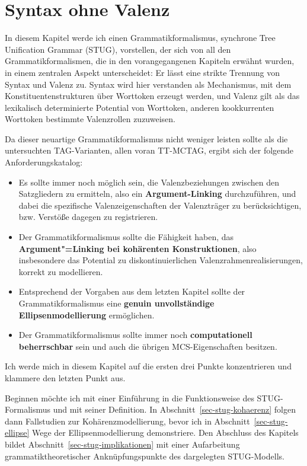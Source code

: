 \chapter{Syntax ohne Valenz} \label{ch-ohne-valenz}

In diesem Kapitel werde ich einen Grammatikformalismus, synchrone Tree Unification Grammar (STUG), vorstellen, der sich von all den Grammatikformalismen, die in den vorangegangenen Kapiteln erwähnt wurden, in einem zentralen Aspekt unterscheidet: Er lässt eine strikte Trennung von Syntax und Valenz zu. Syntax wird hier verstanden als Mechanismus, mit dem Konstituentenstrukturen über Worttoken erzeugt werden, und Valenz gilt als das lexikalisch determinierte Potential von Worttoken, anderen kookkurrenten Worttoken bestimmte Valenzrollen zuzuweisen.  

Da dieser neuartige Grammatikformalismus nicht weniger leisten sollte als die untersuchten TAG-Varianten, allen voran TT-MCTAG, ergibt sich der folgende Anforderungskatalog:
\begin{itemize}
  \item Es sollte immer noch möglich sein, die Valenzbeziehungen zwischen den Satzgliedern zu ermitteln, also ein {\bf Argument-Linking} durchzuführen, und dabei die spezifische Valenzeigenschaften der Valenzträger zu berücksichtigen, bzw. Verstö\ss e dagegen zu registrieren. 
  \item Der Grammatikformalismus sollte die Fähigkeit haben, das {\bf Argument"=Linking bei kohärenten Konstruktionen}, also insbesondere das Potential zu diskontinuierlichen Valenzrahmenrealisierungen, korrekt zu modellieren. 
  \item Entsprechend der Vorgaben aus dem letzten Kapitel sollte der Grammatikformalismus eine {\bf genuin unvollständige Ellipsenmodellierung} ermöglichen.
  \item Der Grammatikformalismus sollte immer noch {\bf computationell beherrschbar} sein und auch die übrigen MCS-Eigenschaften besitzen.
\end{itemize}
Ich werde mich in diesem Kapitel auf die ersten drei Punkte konzentrieren und klammere den letzten Punkt aus.

Beginnen möchte ich mit einer Einführung in die Funktionsweise des STUG-Formalismus und mit seiner Definition. In Abschnitt~\ref{sec-stug-kohaerenz} folgen dann Fallstudien zur Kohärenzmodellierung, bevor ich in Abschnitt~\ref{sec-stug-ellipse} Wege der Ellipsenmodellierung demonstriere. Den Abschluss des Kapitels bildet Abschnitt~\ref{sec-stug-implikationen} mit einer Aufarbeitung grammatiktheoretischer Anknüpfungspunkte des dargelegten STUG-Modells.


